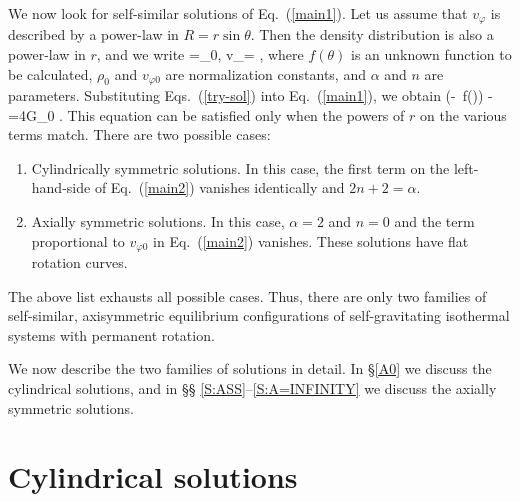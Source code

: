 We now look for self-similar solutions of Eq.\ (\ref{main1}). Let us assume
that $v_\varphi$ is described by a power-law in $R=r\sin\theta$. Then the 
density distribution is also a power-law in $r$, and we write
\beq
\rho=\rho_0,\qquad 
v_\varphi= ,
\label{try-sol}
\eeq
where $f(\theta)$ is an unknown function to be calculated, $\rho_0$ and
$v_{\varphi 0}$ are normalization constants, and $\alpha$ and $n$ are
parameters. Substituting Eqs.\ (\ref{try-sol}) into Eq.\ (\ref{main1}), 
we obtain
\beq
{}\left(\alpha-\pd{}{\theta}{}\;
\sin\theta\pd{}{\theta}{}\,\ln f(\theta)\right)
-
=4\pi G\rho_0 .
\label{main2}
\eeq
This equation can be satisfied only when the powers of $r$ on the various
terms match. There are two possible cases:
\begin{enumerate}
\item
Cylindrically symmetric solutions. In this case, the first term on the 
left-hand-side of Eq.\ (\ref{main2}) vanishes identically and $2n+2=\alpha$.
\item
Axially symmetric solutions. In this case, $\alpha=2$ and $n=0$ and 
the term proportional to $v_{\varphi 0}$ in Eq.\ (\ref{main2}) vanishes.
These solutions have flat rotation curves.
\end{enumerate}
The above list exhausts all possible cases. Thus, there are only two families
of self-similar, axisymmetric equilibrium configurations of self-gravitating 
isothermal systems with permanent rotation. 

We now describe the two families of solutions in detail. In \S \ref{A0} 
we discuss the cylindrical solutions, and in \S\S 
\ref{S:ASS}--\ref{S:A=INFINITY} we discuss the axially symmetric solutions.


\section{Cylindrical solutions \label{A0} }

